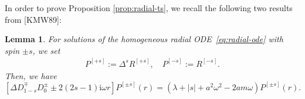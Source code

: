 \documentclass[11pt]{article}
\newtheorem{lemma}[proposition]{Lemma}
\newtheorem{remark}[proposition]{Remark}
\newcommand{\ii}{\mathrm{i}}
\newcommand{\cH}{\mathcal H}
\newcommand{\cI}{\mathcal I}
\numberwithin{equation}{section}
\begin{document}

In order to prove Proposition \ref{prop:radial-ts}, we recall the following two results from [KMW89]:

\begin{lemma}\label{lem:P-ode} For solutions of the homogeneous radial ODE~\eqref{eq:radial-ode} with spin $\pm s$, we set
\begin{align*}
P^{[+ s]}:=\Delta^s R^{[+s]}, \quad P^{[-s]}:=R^{[-s]}.
\end{align*}
Then, we have
\begin{equation}\label{eq:P-ode}
\left[\Delta D^{\mp}_{1-s}D^{\pm}_0\pm2(2s-1)\ii\omega r\right]P^{[\pm s]}(r)
 =\left(\lambda+|s|+a^2\omega^2-2am\omega\right)P^{[\pm s]}(r).
\end{equation}
\end{lemma}
\end{document}

